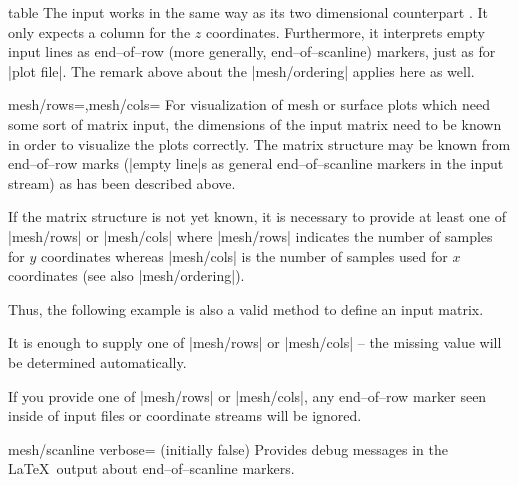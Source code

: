 {\begin{addplot3operation}[]{table}{}
	The  input works in the same way as its two dimensional counterpart . It only expects a column for the $z$ coordinates. Furthermore, it interprets empty input lines as end--of--row (more generally, end--of--scanline) markers, just as for |plot file|. The remark above about the |mesh/ordering| applies here as well.
\end{addplot3operation}

\begin{pgfplotskeylist}{mesh/rows=,mesh/cols=}
	For visualization of mesh or surface plots which need some sort of matrix input, the dimensions of the input matrix need to be known in order to visualize the plots correctly. The matrix structure may be known from end--of--row marks (|empty line|s as general end--of--scanline markers in the input stream) as has been described above.

	If the matrix structure is not yet known, it is necessary to provide at least one of |mesh/rows| or |mesh/cols| where |mesh/rows| indicates the number of samples for $y$ coordinates whereas |mesh/cols| is the number of samples used for $x$ coordinates (see also |mesh/ordering|). 

	Thus, the following example is also a valid method to define an input matrix.
\begin{codeexample}[]
\end{codeexample}

	It is enough to supply one of |mesh/rows| or |mesh/cols| -- the missing value will be determined automatically.
	
	If you provide one of |mesh/rows| or |mesh/cols|, any end--of--row marker seen inside of input files or coordinate streams will be ignored.

\end{pgfplotskeylist}

\begin{pgfplotskeylist}{mesh/scanline verbose= (initially false)}
	Provides debug messages in the \LaTeX\ output about end--of--scanline markers.


\end{pgfplotskeylist}}
